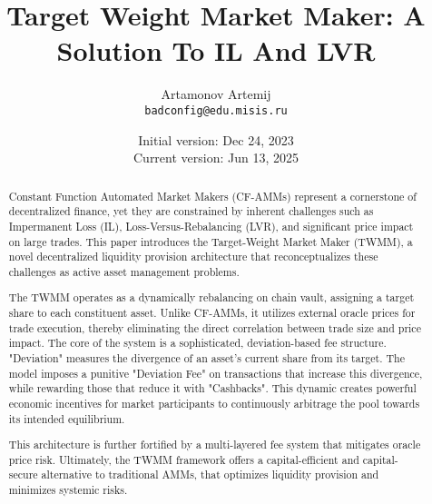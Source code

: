 \documentclass{article}
\title{Target Weight Market Maker: A Solution To IL And LVR}
\author{Artamonov Artemij \\
	\texttt{badconfig@edu.misis.ru}}
\date{Initial version: Dec 24, 2023\\Current version: Jun 13, 2025}
\begin{document}
\maketitle

\begin{abstract}
Constant Function Automated Market Makers (CF-AMMs) represent a cornerstone of decentralized finance, yet they are constrained by inherent challenges such as Impermanent Loss (IL), Loss-Versus-Rebalancing (LVR), and significant price impact on large trades. This paper introduces the Target-Weight Market Maker (TWMM), a novel decentralized liquidity provision architecture that reconceptualizes these challenges as active asset management problems.

The TWMM operates as a dynamically rebalancing on chain vault, assigning a target share to each constituent asset. Unlike CF-AMMs, it utilizes external oracle prices for trade execution, thereby eliminating the direct correlation between trade size and price impact. The core of the system is a sophisticated, deviation-based fee structure. "Deviation" measures the divergence of an asset's current share from its target. The model imposes a punitive "Deviation Fee" on transactions that increase this divergence, while rewarding those that reduce it with "Cashbacks". This dynamic creates powerful economic incentives for market participants to continuously arbitrage the pool towards its intended equilibrium.

This architecture is further fortified by a multi-layered fee system that mitigates oracle price risk. Ultimately, the TWMM framework offers a capital-efficient and capital-secure alternative to traditional AMMs, that optimizes liquidity provision and minimizes systemic risks.
\end{abstract}

\tableofcontents


\pagebreak

\pagebreak

\pagebreak

\pagebreak






\end{document}

